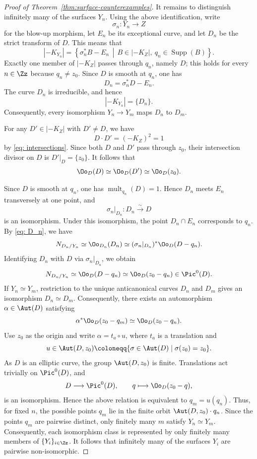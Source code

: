 \documentclass[12pt]{amsart}
\begin{document}
\begin{proof}[Proof of Theorem~\ref{thm:surface-counterexamples}]
It remains to distinguish infinitely many of the surfaces \(Y_n\).
Using the above identification, write
\[
 \sigma_n\colon Y_n\to Z
\]
for the blow-up morphism, let $E_n$ be its exceptional curve, and let $D_n$
be the strict transform of $D$. This means that
\[
 |-K_{Y_n}|
 =
 \left\{
 \sigma_n^*B-E_n
 \,\middle|\,
 B\in|-K_Z|,\ q_n\in\operatorname{Supp}(B)
 \right\}.
\]
Exactly one member of $|-K_Z|$ passes through $q_n$, namely $D$; this holds for every $n\in\Zz$ because $q_n\ne z_0$. Since
$D$ is smooth at $q_n$, one has 
\begin{equation}\label{eq: D_n}
  D_n =\sigma_n^*D-E_n.
\end{equation} The curve $D_n$ is irreducible, and hence
\begin{equation}\label{eq:unique-anticanonical}
 |-K_{Y_n}|=\{D_n\}.
\end{equation}
Consequently, every isomorphism $Y_n\to Y_m$ maps $D_n$ to $D_m$.

For any $D'\in|-K_Z|$ with $D'\neq D$, we have
\[
 D\cdot D'=(-K_Z)^2=1
\] by \eqref{eq: intersections}.
Since both $D$ and $D'$ pass through $z_0$, their intersection
divisor on $D$ is $D'|_D=\{z_0\}$. It follows that
\[
 \Oo_D(D)
 \simeq
 \Oo_D(D')
 \simeq
 \Oo_D(z_0).
\]

Since $D$ is smooth at $q_n$, one has
$\operatorname{mult}_{q_n}(D)=1$. Hence $D_n$ meets $E_n$ transversely at
one point, and
\[
 \sigma_n|_{D_n}\colon D_n\xrightarrow{\sim}D
\]
is an isomorphism. Under this isomorphism, the point ${D_n}\cap {E_n}$
corresponds to $q_n$. By \eqref{eq: D_n}, we have
\[
 N_{D_n/Y_n}\simeq\Oo_{D_n}(D_n)
 \simeq(\sigma_n|_{D_n})^*\Oo_D(D-q_n).
\]
Identifying $D_n$ with $D$ via $\sigma_n|_{D_n}$, we obtain
\begin{equation}\label{eq:normal-anticanonical}
 N_{D_n/Y_n}
 \simeq
 \Oo_D(D-q_n)
 \simeq
\Oo_D(z_0-q_n)
 \in\Pic^0(D).
\end{equation}
If $Y_n\simeq Y_m$, restriction to the unique anticanonical curves
$D_n$ and $D_m$ gives an isomorphism $D_n\simeq D_m$. Consequently,
there exists an automorphism $\alpha\in\Aut(D)$ satisfying
\[
 \alpha^*\Oo_D(z_0-q_m)\simeq\Oo_D(z_0-q_n).
\]
Use $z_0$ as the origin and write
$\alpha=t_a\circ u$, where $t_a$ is a translation and
\[u \in \Aut(D,z_0) \coloneqq \{\sigma \in \Aut(D) \mid \sigma(z_0)=z_0\}.\] As $D$ is an elliptic curve, the group $\Aut(D,z_0)$ is finite. Translations
act trivially on $\Pic^0(D)$, and
\[
 D\longrightarrow\Pic^0(D),
 \qquad
 q\longmapsto\Oo_D(z_0-q),
\]
is an isomorphism. Hence the above relation is equivalent to
$q_m=u(q_n)$. Thus, for fixed $n$, the possible points $q_m$ lie in the
finite orbit $\Aut(D,z_0)\cdot q_n$. Since the points $q_m$ are pairwise
distinct, only finitely many $m$ satisfy $Y_n\simeq Y_m$. Consequently, each
isomorphism class is represented by only finitely many members of
$\{Y_i\}_{i\in\Zz}$. It follows that infinitely many of the surfaces $Y_i$
are pairwise non-isomorphic.
\end{proof}
\end{document}
